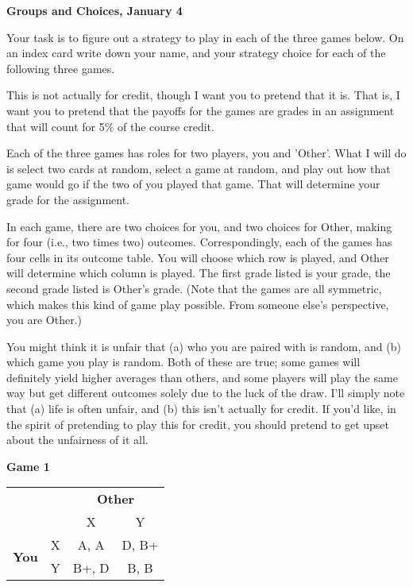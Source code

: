 \documentclass[12pt]{article}
\begin{document}
\begin{center}
\begin{large}
\textbf{Groups and Choices, January 4}
\end{large}
\end{center}

Your task is to figure out a strategy to play in each of the three games below. On an index card write down your name, and your strategy choice for each of the following three games.

This is not actually for credit, though I want you to pretend that it is. That is, I want you to pretend that the payoffs for the games are grades in an assignment that will count for 5\% of the course credit.

Each of the three games has roles for two players, you and 'Other'. What I will do is select two cards at random, select a game at random, and play out how that game would go if the two of you played that game. That will determine your grade for the assignment.

In each game, there are two choices for you, and two choices for Other, making for four (i.e., two times two) outcomes. Correspondingly, each of the games has four cells in its outcome table. You will choose which row is played, and Other will determine which column is played. The first grade listed is your grade, the second grade listed is Other’s grade. (Note that the games are all symmetric, which makes this kind of game play possible. From someone else’s perspective, you are Other.)

You might think it is unfair that (a) who you are paired with is random, and (b) which game you play is random. Both of these are true; some games will definitely yield higher averages than others, and some players will play the same way but get different outcomes solely due to the luck of the draw. I'll simply note that (a) life is often unfair, and (b) this isn't actually for credit. If you’d like, in the spirit of pretending to play this for credit, you should pretend to get upset about the unfairness of it all.

\bigskip
\begin{large}
\textbf{Game 1}
\end{large}

\begin{center}
\begin{tabular}{l r | c c}
 & & \multicolumn{2}{c}{\textbf{Other}} \\
& & X & Y \\ \hline
\multirow{2}{*}{\textbf{You}} & X & A, A & D, B+ \\ & Y & B+, D & B, B \\
\end{tabular}
\end{center}
\end{document}
